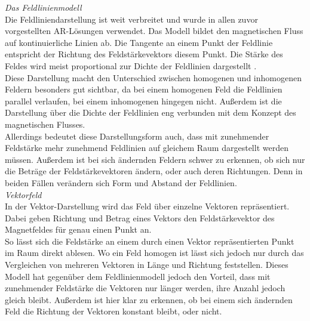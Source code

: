 \textit{Das Feldlinienmodell}\\
Die Feldliniendarstellung ist weit verbreitet und wurde in allen zuvor vorgestellten AR-Lösungen verwendet. Das Modell bildet den magnetischen Fluss auf kontinuierliche Linien ab. Die Tangente an einem Punkt der Feldlinie entspricht der Richtung des Feldstärkevektors diesem Punkt. Die Stärke des Feldes wird meist proportional zur Dichte der Feldlinien dargestellt \cite{Kilian03}.\\

Diese Darstellung macht den Unterschied zwischen homogenen und inhomogenen Feldern besonders gut sichtbar, da bei einem homogenen Feld die Feldlinien parallel verlaufen, bei einem inhomogenen hingegen nicht. Außerdem ist die Darstellung über die Dichte der Feldlinien eng verbunden mit dem Konzept des magnetischen Flusses.\\

Allerdings bedeutet diese Darstellungsform auch, dass mit zunehmender Feldstärke mehr zunehmend Feldlinien auf gleichem Raum dargestellt werden müssen. Außerdem ist bei sich ändernden Feldern schwer zu erkennen, ob sich nur die Beträge der Feldstärkevektoren ändern, oder auch deren Richtungen. Denn in beiden Fällen verändern sich Form und Abstand der Feldlinien.\\

\textit{Vektorfeld}\\
In der Vektor-Darstellung wird das Feld über einzelne Vektoren repräsentiert. Dabei geben Richtung und Betrag eines Vektors den Feldstärkevektor des Magnetfeldes für genau einen Punkt an.\\
So lässt sich die Feldstärke an einem durch einen Vektor repräsentierten Punkt im Raum direkt ablesen. Wo ein Feld homogen ist lässt sich jedoch nur durch das Vergleichen von mehreren Vektoren in Länge und Richtung feststellen. Dieses Modell hat gegenüber dem Feldlinienmodell jedoch den Vorteil, dass mit zunehmender Feldstärke die Vektoren nur länger werden, ihre Anzahl jedoch gleich bleibt. Außerdem ist hier klar zu erkennen, ob bei einem sich ändernden Feld die Richtung der Vektoren konstant bleibt, oder nicht.

